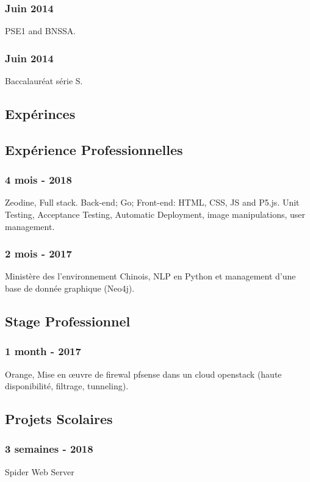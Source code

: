\documentclass{article}
\begin{document}
        \subsubsection{Juin 2014}
            PSE1 and BNSSA.
        \subsubsection{Juin 2014}
            Baccalaur\'eat s\'erie S.


    \begin{multicols}{2}
        \section{Exp\'erinces}
            \subsection{Exp\'erience Professionnelles}
                \subsubsection{4 mois - 2018}
                    Zeodine, Full stack. Back-end; Go; Front-end: HTML, CSS, JS and P5.js.
                    Unit Testing, Acceptance Testing, Automatic Deployment, image manipulations, user management.
                \subsubsection{2 mois - 2017}
                    Minist\`ere des l'environnement Chinois, NLP en Python et management d'une base de donn\'ee graphique (Neo4j).
            \subsection{Stage Professionnel}
                \subsubsection{1 month - 2017}
                    Orange, Mise en \oe{}uvre de firewal pfsense dans un cloud openstack (haute disponibilit\'e, filtrage, tunneling).
            \subsection{Projets Scolaires}
                \subsubsection{3 semaines - 2018}
                    Spider Web Server

\end{multicols}
\end{document}
